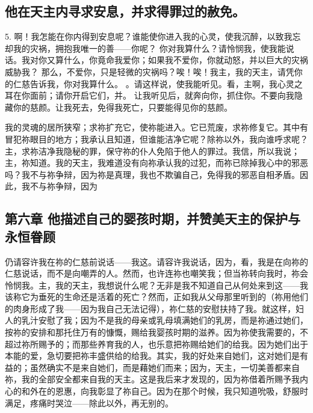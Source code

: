 
\subsection{他在天主内寻求安息，并求得罪过的赦免。}

5. 啊！我怎能在你内得到安息呢？谁能使你进入我的心灵，使我沉醉，以致我忘却我的灾祸，拥抱我唯一的善——你呢？ 你对我算什么？请怜悯我，使我能说话。我对你又算什么，你竟命我爱你；如果我不爱你，你就动怒，并以巨大的灾祸威胁我？ 那么，不爱你，只是轻微的灾祸吗？唉！唉！我主，我的天主，请凭你的仁慈告诉我，你对我算什么。 。请这样说，使我能听见。看，主啊，我心灵之耳在你面前；请你开启它们，并。 让我听见后，就奔向你，抓住你。不要向我隐藏你的慈颜。让我死去，免得我死亡，只要能得见你的慈颜。\par

我的灵魂的居所狭窄；求祢扩充它，使祢能进入。它已荒废，求祢修复它。其中有冒犯祢眼目的地方；我承认且知道，但谁能洁净它呢？除祢以外，我向谁呼求呢？主，求祢洁净我隐秘的罪，保守祢的仆人免陷于他人的罪过。我信，所以我说；主，祢知道。我的天主，我难道没有向祢承认我的过犯，而祢已除掉我心中的邪恶吗？我不与祢争辩，因为祢是真理，我也不欺骗自己，免得我的邪恶自相矛盾。因此，我不与祢争辩，因为\par


\subsection{第六章 他描述自己的婴孩时期，并赞美天主的保护与永恒眷顾}

仍请容许我在祢的仁慈前说话——我这。请容许我说话，因为，看，我是在向祢的仁慈说话，而不是向嘲弄的人。然而，也许连祢也嘲笑我；但当祢转向我时，祢会怜悯我。主，我的天主，我想说什么呢？无非是我不知道自己从何处来到这——我该称它为垂死的生命还是活着的死亡？然而，正如我从父母那里听到的（祢用他们的肉身形成了我——因为我自己无法记得），祢仁慈的安慰扶持了我。就这样，妇人的乳汁安慰了我；因为不是我的母亲或乳母填满她们的乳房，而是祢通过她们，按祢的安排和那托住万有的慷慨，赐给我婴孩时期的滋养。因为祢使我需要的，不超过祢所赐予的；而那些养育我的人，也乐意把祢赐给她们的给我。因为她们出于本能的爱，急切要把祢丰盛供给的给我。其实，我的好处来自她们，这对她们是有益的；虽然确实不是来自她们，而是藉她们而来；因为，天主，一切美善都来自祢，我的全部安全都来自我的天主。这是我后来才发现的，因为祢借着所赐予我内心的和外在的恩惠，向我彰显了祢自己。因为在那个时候，我只知道吮吸，舒服时满足，疼痛时哭泣——除此以外，再无别的。\par

